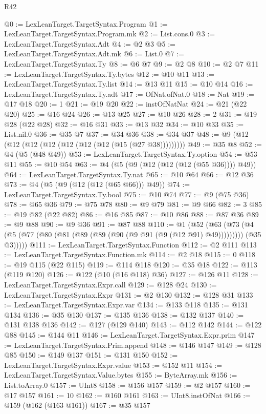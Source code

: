 \begin{lexlean}{R42}
\begin{coremodule}
@0 := LexLeanTarget.TargetSyntax.Program
@1 := LexLeanTarget.TargetSyntax.Program.mk
@2 := List.cons.{0}
@3 := LexLeanTarget.TargetSyntax.Adt
@4 := @2 @3
@5 := LexLeanTarget.TargetSyntax.Adt.mk
@6 := List.{0}
@7 := LexLeanTarget.TargetSyntax.Ty
@8 := @6 @7
@9 := @2 @8
@10 := @2 @7
@11 := LexLeanTarget.TargetSyntax.Ty.bytes
@12 := @10 @11
@13 := LexLeanTarget.TargetSyntax.Ty.list
@14 := @13 @11
@15 := @10 @14
@16 := LexLeanTarget.TargetSyntax.Ty.adt
@17 := OfNat.ofNat.{0}
@18 := Nat
@19 := @17 @18
@20 := 1
@21 := @19 @20
@22 := instOfNatNat
@24 := @21 (@22 @20)
@25 := @16 @24
@26 := @13 @25
@27 := @10 @26
@28 := 2
@31 := @19 @28 (@22 @28)
@32 := @16 @31
@33 := @13 @32
@34 := @10 @33
@35 := List.nil.{0}
@36 := @35 @7
@37 := @34 @36
@38 := @34 @37
@48 := @9 (@12 (@12 (@12 (@12 (@12 (@12 (@12 (@15 (@27 @38)))))))))
@49 := @35 @8
@52 := @4 (@5 (@48 @49))
@53 := LexLeanTarget.TargetSyntax.Ty.option
@54 := @53 @11
@55 := @10 @54
@63 := @4 (@5 (@9 (@12 (@12 (@12 (@55 @36)))) @49))
@64 := LexLeanTarget.TargetSyntax.Ty.nat
@65 := @10 @64
@66 := @12 @36
@73 := @4 (@5 (@9 (@12 (@12 (@65 @66))) @49))
@74 := LexLeanTarget.TargetSyntax.Ty.bool
@75 := @10 @74
@77 := @9 (@75 @36)
@78 := @65 @36
@79 := @75 @78
@80 := @9 @79
@81 := @9 @66
@82 := 3
@85 := @19 @82 (@22 @82)
@86 := @16 @85
@87 := @10 @86
@88 := @87 @36
@89 := @9 @88
@90 := @9 @36
@91 := @87 @88
@110 := @1
    (@52
      (@63
        (@73 (@4 (@5 (@77 (@80 (@81 (@89 (@89 (@90 (@9 @91 (@9 (@12 @91) @49))))))))) (@35 @3)))))
@111 := LexLeanTarget.TargetSyntax.Function
@112 := @2 @111
@113 := LexLeanTarget.TargetSyntax.Function.mk
@114 := @2 @18
@115 := 0
@118 := @19 @115 (@22 @115)
@119 := @114 @118
@120 := @35 @18
@122 := @113 (@119 @120)
@126 := @122 (@10 (@16 @118) @36)
@127 := @126 @11
@128 := LexLeanTarget.TargetSyntax.Expr.call
@129 := @128 @24
@130 := LexLeanTarget.TargetSyntax.Expr
@131 := @2 @130
@132 := @128 @31
@133 := LexLeanTarget.TargetSyntax.Expr.var
@134 := @133 @118
@135 := @131 @134
@136 := @35 @130
@137 := @135 @136
@138 := @132 @137
@140 := @131 @138 @136
@142 := @127 (@129 @140)
@143 := @112 @142
@144 := @122 @88
@145 := @144 @11
@146 := LexLeanTarget.TargetSyntax.Expr.prim
@147 := LexLeanTarget.TargetSyntax.Prim.append
@148 := @146 @147
@149 := @128 @85
@150 := @149 @137
@151 := @131 @150
@152 := LexLeanTarget.TargetSyntax.Expr.value
@153 := @152 @11
@154 := LexLeanTarget.TargetSyntax.Value.bytes
@155 := ByteArray.mk
@156 := List.toArray.{0}
@157 := UInt8
@158 := @156 @157
@159 := @2 @157
@160 := @17 @157
@161 := 10
@162 := @160 @161
@163 := UInt8.instOfNat
@166 := @159 (@162 (@163 @161))
@167 := @35 @157

\end{coremodule}
\end{lexlean}
